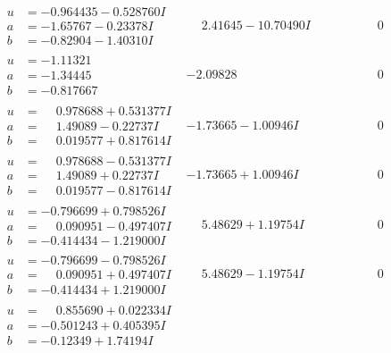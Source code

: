 \documentclass[1p]{elsarticle_modified}
\theoremstyle{definition}
\begin{document}
$$\begin{array}{c|c|c}
\begin{aligned}
u &= -0.964435 - 0.528760 I \\
a &= -1.65767 - 0.23378 I \\
b &= -0.82904 - 1.40310 I\end{aligned}
 & \phantom{-}2.41645 - 10.70490 I & \phantom{-0.000000 } 0 \\ \hline\begin{aligned}
u &= -1.11321\phantom{ +0.000000I} \\
a &= -1.34445\phantom{ +0.000000I} \\
b &= -0.817667\phantom{ +0.000000I}\end{aligned}
 & -2.09828\phantom{ +0.000000I} & \phantom{-0.000000 } 0 \\ \hline\begin{aligned}
u &= \phantom{-}0.978688 + 0.531377 I \\
a &= \phantom{-}1.49089 - 0.22737 I \\
b &= \phantom{-}0.019577 + 0.817614 I\end{aligned}
 & -1.73665 - 1.00946 I & \phantom{-0.000000 } 0 \\ \hline\begin{aligned}
u &= \phantom{-}0.978688 - 0.531377 I \\
a &= \phantom{-}1.49089 + 0.22737 I \\
b &= \phantom{-}0.019577 - 0.817614 I\end{aligned}
 & -1.73665 + 1.00946 I & \phantom{-0.000000 } 0 \\ \hline\begin{aligned}
u &= -0.796699 + 0.798526 I \\
a &= \phantom{-}0.090951 - 0.497407 I \\
b &= -0.414434 - 1.219000 I\end{aligned}
 & \phantom{-}5.48629 + 1.19754 I & \phantom{-0.000000 } 0 \\ \hline\begin{aligned}
u &= -0.796699 - 0.798526 I \\
a &= \phantom{-}0.090951 + 0.497407 I \\
b &= -0.414434 + 1.219000 I\end{aligned}
 & \phantom{-}5.48629 - 1.19754 I & \phantom{-0.000000 } 0 \\ \hline\begin{aligned}
u &= \phantom{-}0.855690 + 0.022334 I \\
a &= -0.501243 + 0.405395 I \\
b &= -0.12349 + 1.74194 I\end{aligned}

\end{array}$$
\end{document}
